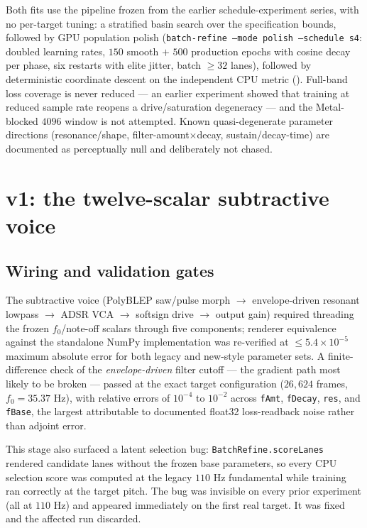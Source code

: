 \documentclass[10pt]{article}
\newcommand{\code}[1]{\texttt{#1}}
\begin{document}
Both fits use the pipeline frozen from the earlier schedule-experiment series, with no per-target tuning: a stratified basin search over the specification bounds, followed by GPU population polish (\code{batch-refine --mode polish --schedule s4}: doubled learning rates, $150$ smooth $+$ $500$ production epochs with cosine decay per phase, six restarts with elite jitter, batch $\ge 32$ lanes), followed by deterministic coordinate descent on the independent CPU metric (). Full-band loss coverage is never reduced --- an earlier experiment showed that training at reduced sample rate reopens a drive/saturation degeneracy --- and the Metal-blocked $4096$ window is not attempted. Known quasi-degenerate parameter directions (resonance/shape, filter-amount$\times$decay, sustain/decay-time) are documented as perceptually null and deliberately not chased.

\section{v1: the twelve-scalar subtractive voice}

\subsection{Wiring and validation gates}

The subtractive voice (PolyBLEP saw/pulse morph $\to$ envelope-driven resonant lowpass $\to$ ADSR VCA $\to$ softsign drive $\to$ output gain) required threading the frozen $f_0$/note-off scalars through five components; renderer equivalence against the standalone NumPy implementation was re-verified at $\le 5.4\times10^{-5}$ maximum absolute error for both legacy and new-style parameter sets. A finite-difference check of the \emph{envelope-driven} filter cutoff --- the gradient path most likely to be broken --- passed at the exact target configuration ($26{,}624$ frames, $f_0=35.37$ Hz), with relative errors of $10^{-4}$ to $10^{-2}$ across \code{fAmt}, \code{fDecay}, \code{res}, and \code{fBase}, the largest attributable to documented float32 loss-readback noise rather than adjoint error.

This stage also surfaced a latent selection bug: \code{BatchRefine.scoreLanes} rendered candidate lanes without the frozen base parameters, so every CPU selection score was computed at the legacy $110$ Hz fundamental while training ran correctly at the target pitch. The bug was invisible on every prior experiment (all at $110$ Hz) and appeared immediately on the first real target. It was fixed and the affected run discarded.
\end{document}
